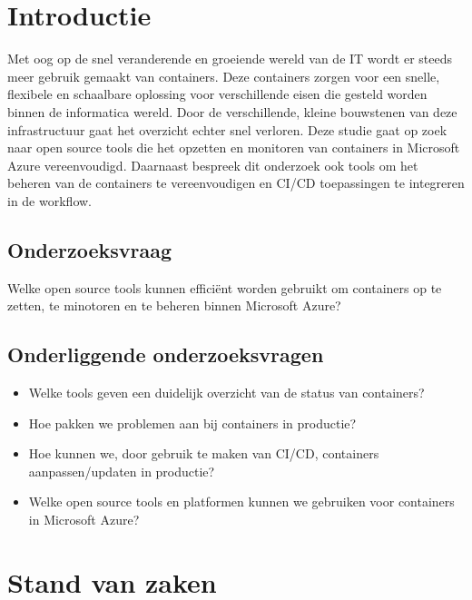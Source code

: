 
\section{Introductie} %
\label{sec:introductie}
Met oog op de snel veranderende en groeiende wereld van de IT wordt er steeds meer gebruik gemaakt van containers. Deze containers zorgen voor een snelle, flexibele en schaalbare oplossing voor verschillende eisen die gesteld worden binnen de informatica wereld. Door de verschillende, kleine bouwstenen van deze infrastructuur gaat het overzicht echter snel verloren. 
Deze studie gaat op zoek naar open source tools die het opzetten en monitoren van containers in Microsoft Azure vereenvoudigd. Daarnaast bespreek dit onderzoek ook tools om het beheren van de containers te vereenvoudigen en CI/CD toepassingen te integreren in de workflow.
\subsection{Onderzoeksvraag}
Welke open source tools kunnen efficiënt worden gebruikt om containers op te zetten, te minotoren en te beheren binnen Microsoft Azure?
\subsection{Onderliggende onderzoeksvragen}
\begin{itemize}
    \item Welke tools geven een duidelijk overzicht van de status van containers?
    \item Hoe pakken we problemen aan bij containers in productie?
    \item Hoe kunnen we, door gebruik te maken van CI/CD, containers aanpassen/updaten in productie?
    \item Welke open source tools en platformen kunnen we gebruiken voor containers in Microsoft Azure?
\end{itemize}

\section{Stand van zaken}
\label{sec:state-of-the-art}

